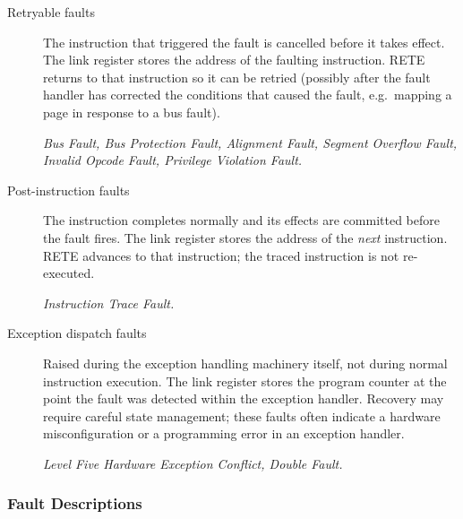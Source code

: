 \begin{description}
	\item[Retryable faults] The instruction that triggered the fault is cancelled before it takes effect. The link
	      register stores the address of the faulting instruction. RETE returns to that instruction so it can be
	      retried (possibly after the fault handler has corrected the conditions that caused the fault, e.g.\ mapping a
	      page in response to a bus fault).

	      \textit{Bus Fault, Bus Protection Fault, Alignment Fault, Segment Overflow Fault, Invalid Opcode Fault,
		      Privilege Violation Fault.}

	\item[Post-instruction faults] The instruction completes normally and its effects are committed before the fault
	      fires. The link register stores the address of the \textit{next} instruction. RETE advances to that
	      instruction; the traced instruction is not re-executed.

	      \textit{Instruction Trace Fault.}

	\item[Exception dispatch faults] Raised during the exception handling machinery itself, not during normal
	      instruction execution. The link register stores the program counter at the point the fault was detected
	      within the exception handler. Recovery may require careful state management; these faults often indicate a
	      hardware misconfiguration or a programming error in an exception handler.

	      \textit{Level Five Hardware Exception Conflict, Double Fault.}
\end{description}

\subsubsection{Fault Descriptions}

